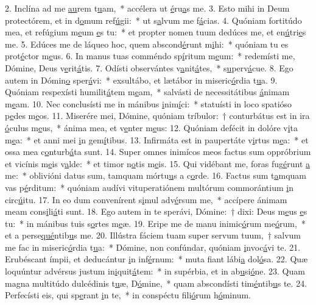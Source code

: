 2. Inclína ad me \uline{au}rem t\uline{u}am,~* accélera ut \uline{é}ru\uline{a}s me.
3. Esto mihi in Deum protectórem, et in d\uline{o}mum ref\uline{ú}gii:~* ut s\uline{a}lvum me f\uline{á}cias.
4. Quóniam fortitúdo mea, et refúgium m\uline{e}um \uline{e}s tu:~* et propter nomen tuum dedúces me, et en\uline{ú}tri\uline{e}s me.
5. Edúces me de láqueo hoc, quem abscond\uline{é}runt m\uline{i}hi:~* quóniam tu es prot\uline{é}ctor m\uline{e}us.
6. In manus tuas comméndo sp\uline{í}ritum m\uline{e}um:~* redemísti me, Dómine, Deus v\uline{e}rit\uline{á}tis.
7. Odísti observántes v\uline{a}nit\uline{á}tes,~* s\uline{u}perv\uline{á}cue.
8. Ego autem in Dómin\uline{o} sper\uline{á}vi:~* exsultábo, et lætábor in miseric\uline{ó}rdia t\uline{u}a.
9. Quóniam respexísti humilit\uline{á}tem m\uline{e}am,~* salvásti de necessitátibus \uline{á}nimam m\uline{e}am.
10. Nec conclusísti me in mánibus \uline{i}nim\uline{í}ci:~* statuísti in loco spatióso p\uline{e}des m\uline{e}os.
11. Miserére mei, Dómine, quóniam tríbulor:~† conturbátus est in ira \uline{ó}culus m\uline{e}us,~* ánima mea, et v\uline{e}nter m\uline{e}us:
12. Quóniam defécit in dolóre v\uline{i}ta m\uline{e}a:~* et anni mei \uline{i}n gem\uline{í}tibus.
13. Infirmáta est in paupertáte v\uline{i}rtus m\uline{e}a:~* et ossa mea c\uline{o}nturb\uline{á}ta sunt.
14. Super omnes inimícos meos factus sum oppróbrium et vicínis m\uline{e}is v\uline{a}lde:~* et timor n\uline{o}tis m\uline{e}is.
15. Qui vidébant me, foras fug\uline{é}runt \uline{a} me:~* oblivióni datus sum, tamquam mórtu\uline{u}s a c\uline{o}rde.
16. Factus sum t\uline{a}mquam vas p\uline{é}rditum:~* quóniam audívi vituperatiónem multórum commorántium \uline{i}n circ\uline{ú}itu.
17. In eo dum convenírent s\uline{i}mul adv\uline{é}rsum me,~* accípere ánimam meam cons\uline{i}li\uline{á}ti sunt.
18. Ego autem in te sperávi, Dómine:~† dixi: Deus m\uline{e}us \uline{e}s tu:~* in mánibus tuis s\uline{o}rtes m\uline{e}æ.
19. Eripe me de manu inimic\uline{ó}rum me\uline{ó}rum,~* et a perse\uline{qué}ntib\uline{u}s me.
20. Illústra fáciem tuam super servum tuum,~† salvum me fac in miseric\uline{ó}rdia t\uline{u}a:~* Dómine, non confúndar, quóniam \uline{i}nvoc\uline{á}vi te.
21. Erubéscant ímpii, et deducántur \uline{i}n inf\uline{é}rnum:~* muta fiant lábi\uline{a} dol\uline{ó}sa.
22. Quæ loquúntur advérsus justum in\uline{i}quit\uline{á}tem:~* in supérbia, et in ab\uline{u}si\uline{ó}ne.
23. Quam magna multitúdo dulcédinis t\uline{u}æ, D\uline{ó}mine,~* quam abscondísti tim\uline{é}ntib\uline{u}s te.
24. Perfecísti eis, qui sp\uline{e}rant \uline{i}n te,~* in conspéctu fili\uline{ó}rum h\uline{ó}minum.
